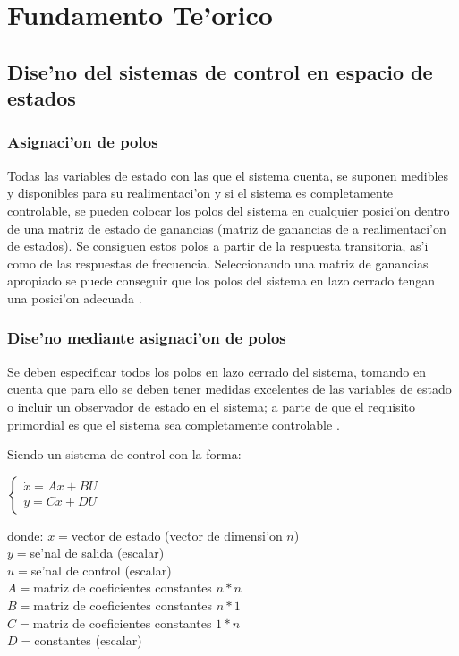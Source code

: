 \chapter{Fundamento Te'orico}
\section{Dise'no del sistemas de control en espacio de estados}

\subsection{Asignaci'on de polos}

Todas las variables de estado con las que el sistema cuenta, se suponen medibles y disponibles para su realimentaci'on y si el sistema es completamente controlable, se pueden colocar los polos del sistema en cualquier posici'on dentro de una matriz de estado de ganancias (matriz de ganancias de a realimentaci'on de estados). Se consiguen estos polos a partir de la respuesta transitoria, as'i como de las respuestas de frecuencia. Seleccionando una matriz de ganancias apropiado se puede conseguir que los polos del sistema en lazo cerrado tengan una posici'on adecuada  \citep{ogata}.

\subsection{Dise'no mediante asignaci'on de polos}

Se deben especificar todos los polos en lazo cerrado del sistema, tomando en cuenta que para ello se deben tener medidas excelentes de las variables de estado o incluir un observador de estado en el sistema; a parte de que el requisito primordial es que el sistema sea completamente controlable \citep{ogata}.

Siendo un sistema de control con la forma:

\setlength{\parskip}{0.1cm}
\begin{center}
$
\left\lbrace
\begin{array}{ll}
\dot{x}=Ax+BU\\
y=Cx+DU
\end{array}
\right.
$
\end{center}
\setlength{\parskip}{0.1cm}
donde: $x=$vector de estado (vector de dimensi'on $n$)\\
			$y=$se'nal de salida (escalar)\\
			$u=$se'nal de control (escalar)\\
			$A=$matriz de coeficientes constantes $n*n$\\
			$B=$matriz de coeficientes constantes $n*1$\\
			$C=$matriz de coeficientes constantes $1*n$\\
			$D=$constantes (escalar)\\

